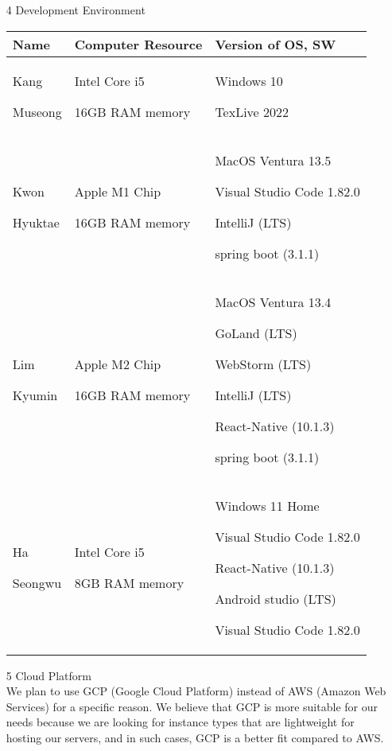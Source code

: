\documentclass[conference]{IEEEtran}
\begin{document}
\begin{enumerate}
\item[4] Development Environment
\begin{table}[h]
\def\arraystretch{1.24} \small
    \begin{tabular}{|p{1.2cm}|p{3.0cm}|p{3.6cm}|}
        \hline
        Name & Computer Resource & Version of OS, SW\\ \hline
         Kang \par Museong & Intel Core i5\par 16GB RAM memory & Windows 10 \par TexLive 2022 \\ \hline
        Kwon \par Hyuktae & Apple M1 Chip \par 16GB RAM memory & MacOS Ventura 13.5 \par Visual Studio Code 1.82.0 \par IntelliJ (LTS)\par spring boot (3.1.1) \\ \hline
        
         Lim \par Kyumin & Apple M2 Chip\par 16GB RAM memory & MacOS Ventura 13.4 \par GoLand (LTS) \par WebStorm (LTS)\par IntelliJ (LTS) \par React-Native (10.1.3) \par spring boot (3.1.1)\\ \hline
        
       Ha \par Seongwu & Intel Core i5 \par 8GB RAM memory & Windows 11 Home \par Visual Studio Code 1.82.0 \par React-Native (10.1.3)\par Android studio (LTS) \par Visual Studio Code 1.82.0 \\ \hline

	\end{tabular}
\end{table}

\item[5] Cloud Platform\\
We plan to use GCP (Google Cloud Platform) instead of AWS (Amazon Web Services) for a specific reason. We believe that GCP is more suitable for our needs because we are looking for instance types that are lightweight for hosting our servers, and in such cases, GCP is a better fit compared to AWS.
\end{enumerate}
\end{document}
